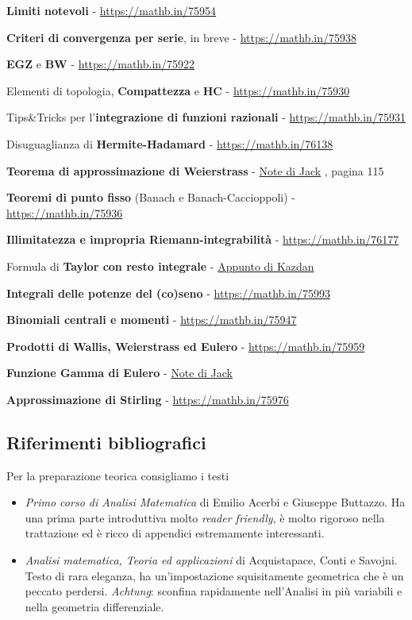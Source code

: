 \documentclass[a4paper,twoside]{article}
\theoremstyle{definition}
\numberwithin{theorem}{section}
\begin{document}
\textbf{Limiti notevoli} - \url{https://mathb.in/75954}

\textbf{Criteri di convergenza per serie}, in breve - \url{https://mathb.in/75938}

\textbf{EGZ} e \textbf{BW} - \url{https://mathb.in/75922}

Elementi di topologia, \textbf{Compattezza} e \textbf{HC} - \url{https://mathb.in/75930}

Tips\&Tricks per l'\textbf{integrazione di funzioni razionali} - \url{https://mathb.in/75931}

Disuguaglianza di \textbf{Hermite-Hadamard} - \url{https://mathb.in/76138}

\textbf{Teorema di approssimazione di Weierstrass} - \href{https://drive.google.com/file/d/1QKCejQNSohMTlZs-MPRndxo5tJ8H48Ez/view?usp=sharing}{Note di Jack} , pagina 115

\textbf{Teoremi di punto fisso} (Banach e Banach-Caccioppoli) - \url{https://mathb.in/75936}

\textbf{Illimitatezza e impropria Riemann-integrabilità} - \url{https://mathb.in/76177}

Formula di \textbf{Taylor con resto integrale} - \href{https://www2.math.upenn.edu/~kazdan/361F15/Notes/Taylor-integral.pdf}{Appunto di Kazdan}

\textbf{Integrali delle potenze del (co)seno} - \url{https://mathb.in/75993}

\textbf{Binomiali centrali e momenti} - \url{https://mathb.in/75947}

\textbf{Prodotti di Wallis, Weierstrass ed Eulero} - \url{https://mathb.in/75959}

\textbf{Funzione Gamma di Eulero} - \href{https://quisirisolve.com/analisi-matematica/funzioni-speciali/funzione-gamma-di-eulero/teoria-ed-esercizi-sulla-funzione-gamma-di-eulero/}{Note di Jack}

\textbf{Approssimazione di Stirling} - \url{https://mathb.in/75976}


\subsection{Riferimenti bibliografici}

Per la preparazione teorica consigliamo i testi
\begin{itemize}
 \item \emph{Primo corso di Analisi Matematica} di Emilio Acerbi e Giuseppe Buttazzo. Ha una prima parte introduttiva molto \emph{reader friendly}, è molto rigoroso nella trattazione ed è ricco di appendici estremamente interessanti.
 \item \emph{Analisi matematica, Teoria ed applicazioni} di Acquistapace, Conti e Savojni. Testo di rara eleganza, ha un'impostazione squisitamente geometrica che è un peccato perdersi. \emph{Achtung}: sconfina rapidamente nell'Analisi in più variabili e nella geometria differenziale.
\end{itemize}
\end{document}
